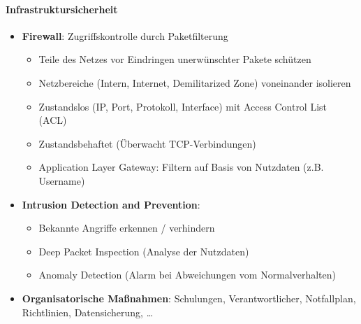 \paragraph{Infrastruktursicherheit}
\begin{itemize}
	\item \textbf{Firewall}: Zugriffskontrolle durch Paketfilterung
	\begin{itemize}
    \item Teile des Netzes vor Eindringen unerwünschter Pakete schützen
    \item Netzbereiche (Intern, Internet, Demilitarized Zone) voneinander isolieren
    \item Zustandslos (IP, Port, Protokoll, Interface) mit Access Control List (ACL)
    \item Zustandsbehaftet (Überwacht TCP-Verbindungen)
    \item Application Layer Gateway: Filtern auf Basis von Nutzdaten (z.B. Username)
  \end{itemize}
	\item \textbf{Intrusion Detection and Prevention}:
	\begin{itemize}
    \item Bekannte Angriffe erkennen / verhindern
    \item Deep Packet Inspection (Analyse der Nutzdaten)
    \item Anomaly Detection (Alarm bei Abweichungen vom Normalverhalten)
  \end{itemize}
	\item \textbf{Organisatorische Maßnahmen}: Schulungen, Verantwortlicher, Notfallplan, Richtlinien, Datensicherung, \dots
\end{itemize}